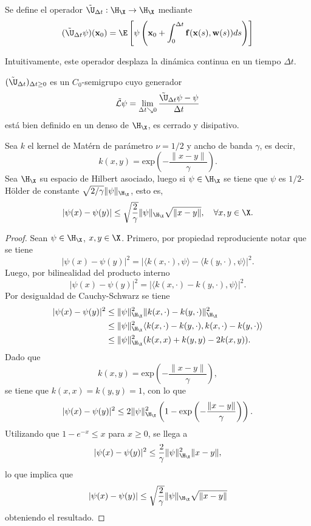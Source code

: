 \begin{defn}
    Se define el operador $\Tilde{\U}_{\Delta t}: \H_\X \to \H_\X$ mediante
    \[
    (\Tilde{\U}_{\Delta t} \psi)(\mathbf{x}_0) = \E \left [\psi \left ( \mathbf{x}_0 + \int_0^{\Delta t} \mathbf{f}(\mathbf{x}(s), \mathbf{w}(s)) ds \right ) \right ]
    \]
\end{defn}

Intuitivamente, este operador desplaza la dinámica continua en un tiempo $\Delta t$. 

\begin{prop}
    $(\Tilde{\U}_{\Delta t})_{\Delta t \geq 0}$ es un $C_0$-semigrupo cuyo generador
    \[
    \Tilde{\mathcal{L}} \psi = \lim_{\Delta t \searrow 0} \frac{\Tilde{\U}_{\Delta t}\psi - \psi}{\Delta t}
    \]
    está bien definido en un denso de $\H_\X$, es cerrado y disipativo.
\end{prop}

\begin{lema}
    Sea $k$ el kernel de Matérn de parámetro $\nu = 1/2$ y ancho de banda $\gamma$, es decir,
    \[
    k(x, y) = \text{exp} \left ( -\frac{\| x- y \|}{\gamma} \right ).
    \]
    Sea $\H_\X$ su espacio de Hilbert asociado, luego si $\psi \in \H_\X$ se tiene que $\psi$ es $1/2$-Hölder de constante $\sqrt{2/\gamma} \| \psi \|_{\H_\X}$, esto es,
    \[
    |\psi(x) - \psi(y)| \leq \sqrt{\frac{2}{\gamma}} \| \psi \|_{\H_\X} \sqrt{\| x - y\|}, \quad \forall x, y \in \X.
    \]
    \label{lemma:matern_lipschitz}
\end{lema}
\begin{proof}
    Sean $\psi \in \H_\X$, $x, y \in \X$. Primero, por propiedad reproduciente notar que se tiene
    \[
    | \psi(x) - \psi(y) |^2 = | \langle k(x, \cdot), \psi \rangle - \langle k(y, \cdot), \psi \rangle  |^2.
    \]
    Luego, por bilinealidad del producto interno
    \[
    | \psi(x) - \psi(y) |^2 = | \langle k(x, \cdot) - k(y, \cdot), \psi \rangle  |^2.
    \]
    Por desigualdad de Cauchy-Schwarz se tiene
    \[
    \begin{aligned}
        | \psi(x) - \psi(y) |^2 &\leq \| \psi \|^2_{\H_\X} \| k(x, \cdot) - k(y, \cdot) \|^2_{\H_\X} \\
        &\leq \| \psi \|^2_{\H_\X} \langle k(x, \cdot) - k(y, \cdot), k(x, \cdot) - k(y, \cdot) \rangle \\
        &\leq \| \psi \|^2_{\H_\X} ( k(x, x) + k(y, y) - 2k(x,y) ).
    \end{aligned}
    \]
    Dado que 
    \[
    k(x, y) = \text{exp} \left ( -\frac{\| x- y \|}{\gamma} \right ),
    \]
    se tiene que $k(x,x) = k(y,y) = 1$, con lo que
    \[
    | \psi(x) - \psi(y) |^2 \leq 2 \| \psi \|^2_{\H_\X} \left ( 1 - \text{exp} \left ( -\frac{\| x- y \|}{\gamma} \right ) \right ).
    \]
    Utilizando que $1 - e^{-x} \leq x$ para $x \geq 0$, se llega a
    \[
    | \psi(x) - \psi(y) |^2 \leq \frac{2}{\gamma} \| \psi \|^2_{\H_\X} \| x - y \|,
    \]
    lo que implica que
    \[
    | \psi(x) - \psi(y) | \leq \sqrt{\frac{2}{\gamma}} \| \psi \|_{\H_\X} \sqrt{\| x - y \|}
    \]
    obteniendo el resultado.
\end{proof}

